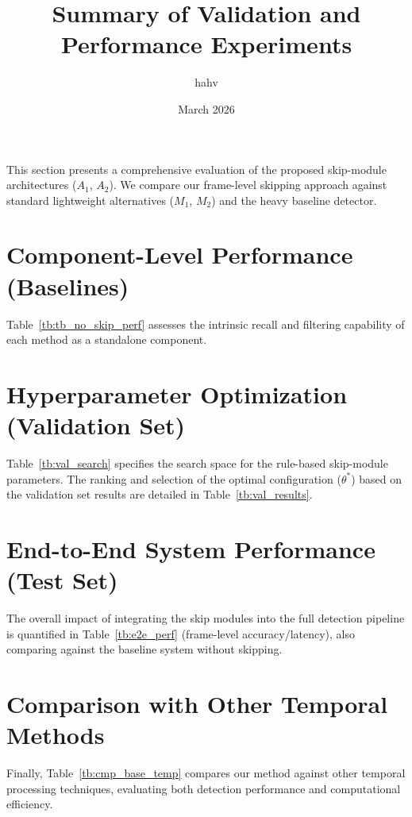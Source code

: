 \documentclass[10pt,a4paper]{article}
\begin{document}
\title{Summary of Validation and Performance Experiments}
\author{hahv}
\date{March 2026}
\maketitle

\noindent This section presents a comprehensive evaluation of the proposed skip-module architectures ($A_1$, $A_2$). We compare our frame-level skipping approach against standard lightweight alternatives ($M_1$, $M_2$) and the heavy baseline detector.

\section{Component-Level Performance (Baselines)}
\noindent Table~\ref{tb:tb_no_skip_perf} assesses the intrinsic recall and filtering capability of each method as a standalone component.


\section{Hyperparameter Optimization (Validation Set)}
\noindent Table~\ref{tb:val_search} specifies the search space for the rule-based skip-module parameters. The ranking and selection of the optimal configuration ($\theta^*$) based on the validation set results are detailed in Table~\ref{tb:val_results}.



\section{End-to-End System Performance (Test Set)}
\noindent The overall impact of integrating the skip modules into the full detection pipeline is quantified in Table~\ref{tb:e2e_perf} (frame-level accuracy/latency), also comparing against the baseline system without skipping.


\section{Comparison with Other Temporal Methods}

\noindent Finally, Table~\ref{tb:cmp_base_temp} compares our method against other temporal processing techniques, evaluating both detection performance and computational efficiency.


\end{document}
